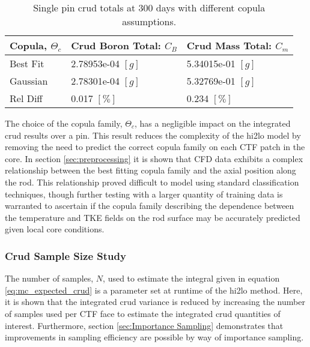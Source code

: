 \begin{table}[h]
    \begin{center}
        \caption[Crud totals with different copula assumptions.]{Single pin crud totals at 300 days with different copula assumptions.}
        \begin{tabular}[h]{|l | l | l |}
            \hline
            Copula, $\Theta_c$ & Crud Boron Total: $C_B$ & Crud Mass Total: $C_m$ \\
            \hline  \hline
            Best Fit &  2.78953e-04 $[g]$ & 5.34015e-01 $[g]$ \\
            Gaussian &  2.78301e-04 $[g]$ & 5.32769e-01 $[g]$ \\
            \hline
            Rel Diff &  0.017 $[\%]$ & 0.234 $[\%]$ \\
            \hline
        \end{tabular}
        \label{tab:crud_totals_copula}
    \end{center}
\end{table}

The choice of the copula family, $\Theta_c$, has a negligible impact on the integrated crud results over a pin.  This result reduces the complexity of the hi2lo model by removing the need to predict the correct copula family on each CTF patch in the core.  In section \ref{sec:preprocessing} it is shown that CFD data exhibits a complex relationship between the best fitting copula family and the axial position along the rod.  This relationship proved difficult to model using standard classification techniques, though further testing with a larger quantity of training data is warranted to ascertain if the copula family describing the dependence between the temperature and TKE fields on the rod surface may be accurately predicted given local core conditions.

\subsubsection{Crud Sample Size Study}

The number of samples, $N$, used to estimate the integral given in equation \ref{eq:mc_expected_crud} is a parameter set at runtime of the hi2lo method.  Here, it is shown that the integrated crud variance is reduced by increasing the number of samples used per CTF face to estimate the integrated crud quantities of interest.   Furthermore, section \ref{sec:Importance Sampling} demonstrates that improvements in sampling efficiency are possible by way of importance sampling.

